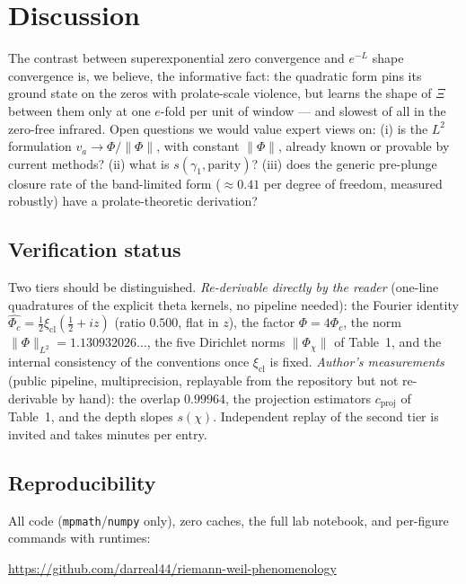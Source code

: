 \documentclass[10pt]{article}
\newcommand{\norm}[1]{\lVert #1\rVert}
\begin{document}
\section{Discussion}

The contrast between superexponential zero convergence and
$e^{-L}$ shape convergence is, we believe, the informative fact: the
quadratic form pins its ground state on the zeros with prolate-scale
violence, but learns the shape of $\Xi$ between them only at one
$e$-fold per unit of window --- and slowest of all in the zero-free
infrared. Open questions we would value expert views on: (i) is the
$L^2$ formulation $v_a\to\Phi/\norm{\Phi}$, with constant
$\norm{\Phi}$, already known or provable by current methods? (ii) what
is $s(\gamma_1,\text{parity})$? (iii) does the generic pre-plunge
closure rate of the band-limited form ($\approx0.41$ per degree of
freedom, measured robustly) have a prolate-theoretic derivation?

\subsection*{Verification status}

Two tiers should be distinguished. \emph{Re-derivable directly by the
reader} (one-line quadratures of the explicit theta kernels, no pipeline
needed): the Fourier identity $\widehat{\Phi_c}=\tfrac12\xi_{\mathrm{cl}}
(\tfrac12+iz)$ (ratio $0.500$, flat in $z$), the factor
$\Phi=4\Phi_c$, the norm $\norm{\Phi}_{L^2}=1.130932026\ldots$, the
five Dirichlet norms $\norm{\Phi_\chi}$ of Table~1, and the internal
consistency of the conventions once $\xi_{\mathrm{cl}}$ is fixed.
\emph{Author's measurements} (public pipeline, multiprecision, replayable
from the repository but not re-derivable by hand): the overlap
$0.99964$, the projection estimators $c_{\mathrm{proj}}$ of Table~1,
and the depth slopes $s(\chi)$. Independent replay of the second tier
is invited and takes minutes per entry.

\subsection*{Reproducibility}

All code (\texttt{mpmath}/\texttt{numpy} only), zero caches, the full
lab notebook, and per-figure commands with runtimes:
\begin{center}
\url{https://github.com/darreal44/riemann-weil-phenomenology}
\end{center}
\end{document}
